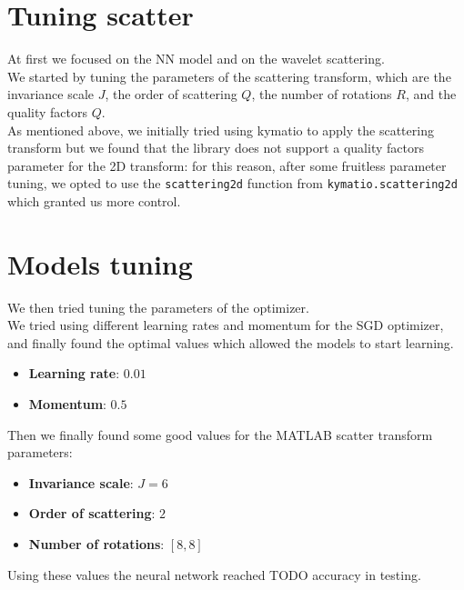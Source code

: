 \documentclass{report}
\begin{document}
\section{Tuning scatter}
At first we focused on the NN model and on the wavelet scattering. \\
We started by tuning the parameters of the scattering transform, which are the invariance scale $J$, the order of scattering $Q$, the number of rotations $R$, and the quality factors $Q$. \\

As mentioned above, we initially tried using kymatio to apply the scattering transform but we found that the library does not support a quality factors parameter for the 2D transform: for this reason, after some fruitless parameter tuning, 
we opted to use the \texttt{scattering2d} function from \texttt{kymatio.scattering2d} which granted us more control. \\

\section{Models tuning}
We then tried tuning the parameters of the optimizer.\\
We tried using different learning rates and momentum for the SGD optimizer, and finally found the optimal values which allowed the models to start learning.
\begin{itemize}
  \item \textbf{Learning rate}: $0.01$ 
  \item \textbf{Momentum}: $0.5$
\end{itemize}

Then we finally found some good values for the MATLAB scatter transform parameters:
\begin{itemize}
  \item \textbf{Invariance scale}: $J=6$
  \item \textbf{Order of scattering}: $2$
  \item \textbf{Number of rotations}: $[8, 8]$
\end{itemize}
Using these values the neural network reached TODO accuracy in testing.\\
\end{document}
